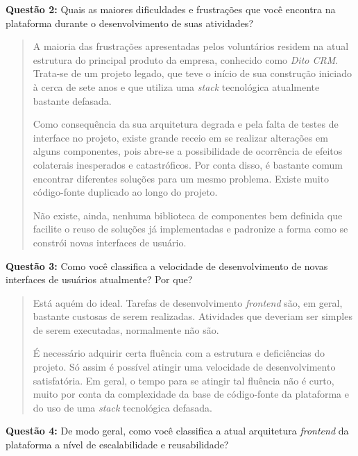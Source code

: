 \textbf{Questão 2:} Quais as maiores dificuldades e frustrações que você encontra na plataforma durante o desenvolvimento de suas atividades?

\begin{quote}
    A maioria das frustrações apresentadas pelos voluntários residem na atual estrutura do principal produto da empresa, conhecido como \textit{Dito CRM}. Trata-se de um projeto legado, que teve o início de sua construção iniciado à cerca de sete anos e que utiliza uma \textit{stack} tecnológica atualmente bastante defasada.
    
    Como consequência da sua arquitetura degrada e pela falta de testes de interface no projeto, existe grande receio em se realizar alterações em alguns componentes, pois abre-se a possibilidade de ocorrência de efeitos colaterais inesperados e catastróficos. Por conta disso, é bastante comum encontrar diferentes soluções para um mesmo problema. Existe muito código-fonte duplicado ao longo do projeto.
    
    Não existe, ainda, nenhuma biblioteca de componentes bem definida que facilite o reuso de soluções já implementadas e padronize a forma como se constrói novas interfaces de usuário.
\end{quote}

\textbf{Questão 3:} Como você classifica a velocidade de desenvolvimento de novas interfaces de usuários atualmente? Por que?

\begin{quote}
    Está aquém do ideal. Tarefas de desenvolvimento \textit{frontend} são, em geral, bastante custosas de serem realizadas. Atividades que deveriam ser simples de serem executadas, normalmente não são.
    
    É necessário adquirir certa fluência com a estrutura e deficiências do projeto. Só assim é possível atingir uma velocidade de desenvolvimento satisfatória. Em geral, o tempo para se atingir tal fluência não é curto, muito por conta da complexidade da base de código-fonte da plataforma e do uso de uma \textit{stack} tecnológica defasada.
\end{quote}

\textbf{Questão 4:} De modo geral, como você classifica a atual arquitetura \textit{frontend} da plataforma a nível de escalabilidade e reusabilidade?

